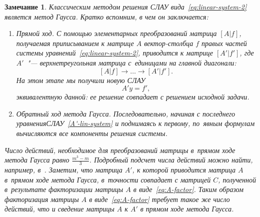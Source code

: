 \documentclass[11pt,a4paper,twoside]{report}
\numberwithin{equation}{section}
\theoremstyle{definition}
\theoremstyle{plain}
\newtheorem*{note*}{Замечание}
\begin{document}
\begin{note*}
    Классическим методом решения СЛАУ вида~\eqref{eq:linear-system-2}
    является метод Гаусса. Кратко вспомним, в чем он заключается:
    \begin{enumerate}
        \item Прямой ход. С помощью элементарных преобразований матрица $[A|f]$,
        получаемая приписыванием к матрице $A$ вектор-столбца $f$ правых частей
        системы уравнений~\eqref{eq:linear-system-2},
        приводится к матрице $[A'|f']$, где $A'$~"--- верхнетреугольная
        матрица с~единицами на главной диагонали:
        $$
            [A|f] \rightarrow \ldots \rightarrow [A'|f'].
        $$
        На этом этапе мы получили новую СЛАУ
        \begin{equation}
            \label{A'-lin-system}
            A'y=f',
        \end{equation}
        эквивалентную данной: ее решение совпадает с решением исходной задачи.
        \item Обратный ход метода Гаусса. Последовательно, начиная с последнего
        уравнения\linebreak СЛАУ~\eqref{A'-lin-system} и поднимаясь к первому,
        по~явным формулам вычисляются все компоненты решения системы.
    \end{enumerate}
    Число действий, необходимое для преобразований матрицы в~прямом ходе метода Гаусса
    равно $\frac{m^3 - m}{3}$. Подробный подсчет числа действий можно найти,
    например, в~\cite{KostFav}. Заметим, что матрица $A'$, к которой приводится матрица $A$
    в~прямом ходе метода Гаусса, в~точности совпадает с матрицей $C$, полученной
    в~результате факторизации матрицы $A$ в виде~\eqref{eq:A-factor}.
    Таким образом факторизация матрицы $A$ в виде~\eqref{eq:A-factor}
    требует такое же число действий, что и сведение матрицы $A$ к $A'$ в прямом ходе
    метода Гаусса.
\end{note*}
%
\end{document}
